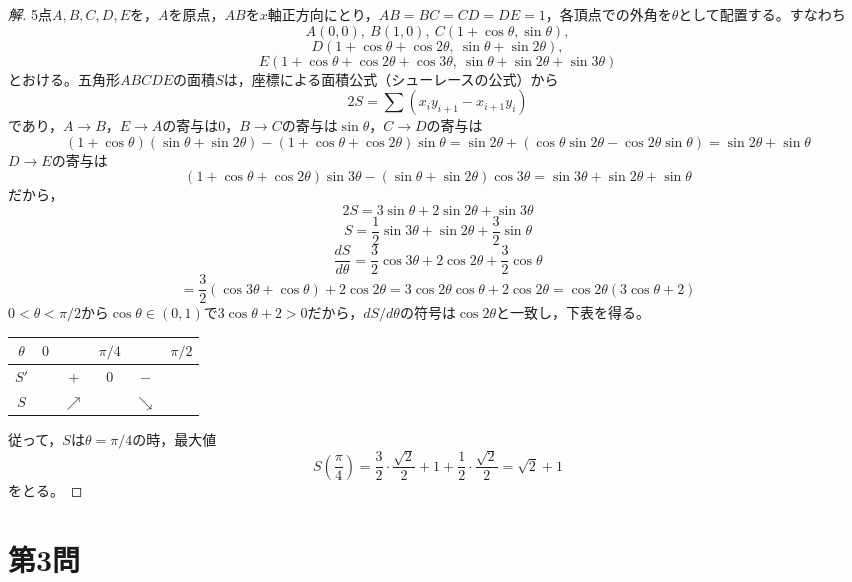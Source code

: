 \documentclass[../main.tex]{subfiles}
\begin{document}
\begin{proof}[解]
  5点$A,B,C,D,E$を，$A$を原点，$AB$を$x$軸正方向にとり，$AB=BC=CD=DE=1$，各頂点での外角を$\theta$として配置する。すなわち
  \[
    A(0,0),\ B(1,0),\ C(1+\cos\theta,\sin\theta),
  \]
  \[
    D(1+\cos\theta+\cos2\theta,\ \sin\theta+\sin2\theta),
  \]
  \[
    E(1+\cos\theta+\cos2\theta+\cos3\theta,\ \sin\theta+\sin2\theta+\sin3\theta)
  \]
  とおける。五角形$ABCDE$の面積$S$は，座標による面積公式（シューレースの公式）から
  \[
    2S=\sum(x_iy_{i+1}-x_{i+1}y_i)
  \]
  であり，$A\to B$，$E\to A$の寄与は0，$B\to C$の寄与は$\sin\theta$，$C\to D$の寄与は
  \[
    (1+\cos\theta)(\sin\theta+\sin2\theta)-(1+\cos\theta+\cos2\theta)\sin\theta=\sin2\theta+(\cos\theta\sin2\theta-\cos2\theta\sin\theta)=\sin2\theta+\sin\theta
  \]
  $D\to E$の寄与は
  \[
    (1+\cos\theta+\cos2\theta)\sin3\theta-(\sin\theta+\sin2\theta)\cos3\theta=\sin3\theta+\sin2\theta+\sin\theta
  \]
  だから，
  \[
    2S=3\sin\theta+2\sin2\theta+\sin3\theta
  \]
  \[
    S=\frac12\sin3\theta+\sin2\theta+\frac32\sin\theta
  \]
  \[
    \frac{dS}{d\theta}=\frac32\cos3\theta+2\cos2\theta+\frac32\cos\theta
  \]
  \[
    =\frac32(\cos3\theta+\cos\theta)+2\cos2\theta=3\cos2\theta\cos\theta+2\cos2\theta=\cos2\theta(3\cos\theta+2)
  \]
  $0<\theta<\pi/2$から$\cos\theta\in(0,1)$で$3\cos\theta+2>0$だから，$dS/d\theta$の符号は$\cos2\theta$と一致し，下表を得る。
  \begin{center}
    \begin{tabular}{c|ccccc}
      $\theta$ & $0$ & & $\pi/4$ & & $\pi/2$ \\
      \hline
      $S'$ & & $+$ & $0$ & $-$ & \\
      \hline
      $S$ & & $\nearrow$ & & $\searrow$ &
    \end{tabular}
  \end{center}
  従って，$S$は$\theta=\pi/4$の時，最大値
  \[
    S\left(\frac{\pi}{4}\right)=\frac32\cdot\frac{\sqrt2}{2}+1+\frac12\cdot\frac{\sqrt2}{2}=\sqrt2+1
  \]
  をとる。
\end{proof}

\newpage

\section*{第3問}
\end{document}
